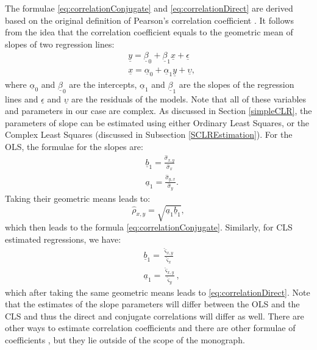 \documentclass[
]{book}
\begin{document}
The formulae \eqref{eq:correlationConjugate} and \eqref{eq:correlationDirect} are derived based on the original definition of Pearson's correlation coefficient \citep{refPearson}. It follows from the idea that the correlation coefficient equals to the geometric mean of slopes of two regression lines:
\begin{equation}
    \begin{aligned}
        &\underline{y} = \underline{\beta}_0 + \underline{\beta}_1 \underline{x} + \underline{\epsilon} \\
        &\underline{x} = \underline{\alpha}_0 + \underline{\alpha}_1 \underline{y} + \underline{\upsilon} ,
    \end{aligned}
    \label{eq:twoRegressions}
\end{equation}
where \(\underline{\alpha}_0\) and \(\underline{\beta}_0\) are the intercepts, \(\underline{\alpha}_1\) and \(\underline{\beta}_1\) are the slopes of the regression lines and \(\underline{\epsilon}\) and \(\underline{\upsilon}\) are the residuals of the models. Note that all of these variables and parameters in our case are complex. As discussed in Section \ref{simpleCLR}, the parameters of slope can be estimated using either Ordinary Least Squares, or the Complex Least Squares (discussed in Subsection \ref{SCLREstimation}). For the OLS, the formulae for the slopes are:
\begin{equation}
    \begin{aligned}
        &\underline{b}_1 = \frac{\hat{\sigma}_{x,y}}{\hat{\sigma}_x} \\
        &\underline{a}_1 = \frac{\hat{\sigma}_{y,x}}{\hat{\sigma}_y} .
    \end{aligned}
    \label{eq:twoRegressionsOLS}
\end{equation}
Taking their geometric means leads to:
\begin{equation}
    \hat{\rho}_{x,y} = \sqrt{\underline{a}_1 \underline{b}_1},
    \label{eq:correlationConventionalEstimate}
\end{equation}
which then leads to the formula \eqref{eq:correlationConjugate}. Similarly, for CLS estimated regressions, we have:
\begin{equation}
    \begin{aligned}
        &\underline{b}_1 = \frac{\hat{\varsigma}_{x,y}}{\hat{\varsigma}_x} \\
        &\underline{a}_1 = \frac{\hat{\varsigma}_{x,y}}{\hat{\varsigma}_y} ,
    \end{aligned}
    \label{eq:twoRegressionsCLS}
\end{equation}
which after taking the same geometric means leads to \eqref{eq:correlationDirect}. Note that the estimates of the slope parameters will differ between the OLS and the CLS and thus the direct and conjugate correlations will differ as well. There are other ways to estimate correlation coefficients \citep[e.g.,][]{Miyabe2015} and there are other formulae of coefficients \citep{Schreier2010}, but they lie outside of the scope of the monograph.
\end{document}
